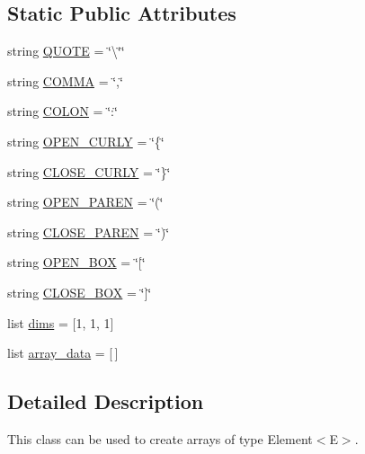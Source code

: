 \subsection*{Static Public Attributes}
\begin{DoxyCompactItemize}
\item 
string \hyperlink{class_bridges_1_1_array_1_1_array_ac5dec20ef3cb532ebf9958795fe1e6ba}{Q\+U\+O\+T\+E} = \char`\"{}\textbackslash{}\char`\"{}\char`\"{}
\item 
string \hyperlink{class_bridges_1_1_array_1_1_array_aaa9996e132ee6be70cdb359bd596dc64}{C\+O\+M\+M\+A} = \char`\"{},\char`\"{}
\item 
string \hyperlink{class_bridges_1_1_array_1_1_array_a51658cf36e5cb6dc4986b817f15509ea}{C\+O\+L\+O\+N} = \char`\"{}\+:\char`\"{}
\item 
string \hyperlink{class_bridges_1_1_array_1_1_array_ac17a4b9180df690a9a2d52bf9dc03777}{O\+P\+E\+N\+\_\+\+C\+U\+R\+L\+Y} = \char`\"{}\{\char`\"{}
\item 
string \hyperlink{class_bridges_1_1_array_1_1_array_a5f584ac8114d40b68f6e56acaa932d42}{C\+L\+O\+S\+E\+\_\+\+C\+U\+R\+L\+Y} = \char`\"{}\}\char`\"{}
\item 
string \hyperlink{class_bridges_1_1_array_1_1_array_a06552399334bd07d4ca2f6fd78620bba}{O\+P\+E\+N\+\_\+\+P\+A\+R\+E\+N} = \char`\"{}(\char`\"{}
\item 
string \hyperlink{class_bridges_1_1_array_1_1_array_acc374b780bd0787e492bba9826e1d639}{C\+L\+O\+S\+E\+\_\+\+P\+A\+R\+E\+N} = \char`\"{})\char`\"{}
\item 
string \hyperlink{class_bridges_1_1_array_1_1_array_aaf751e4c21d36f2d9846655e6f8dd6ce}{O\+P\+E\+N\+\_\+\+B\+O\+X} = \char`\"{}\mbox{[}\char`\"{}
\item 
string \hyperlink{class_bridges_1_1_array_1_1_array_a47c28fbf3a9f58c2f143c4c749cc913c}{C\+L\+O\+S\+E\+\_\+\+B\+O\+X} = \char`\"{}\mbox{]}\char`\"{}
\item 
list \hyperlink{class_bridges_1_1_array_1_1_array_a309aee1788e19f49aff298155b9b7c39}{dims} = \mbox{[}1, 1, 1\mbox{]}
\item 
list \hyperlink{class_bridges_1_1_array_1_1_array_a8c4229d7c455f8e0a571774e34d684ec}{array\+\_\+data} = \mbox{[}$\,$\mbox{]}
\end{DoxyCompactItemize}


\subsection{Detailed Description}
This class can be used to create arrays of type Element$<$\+E$>$. 

